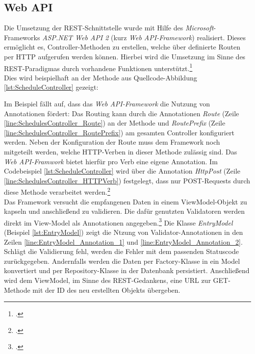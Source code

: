 \subsection{Web API}
\label{ssec:aufbau-webapi}
Die Umsetzung der \ac{REST}-Schnittstelle wurde mit Hilfe des \textit{Microsoft}-Frameworks \textit{ASP.NET Web API 2} (kurz \textit{Web \ac{API}-Framework}) realisiert. Dieses ermöglicht es, Controller-Methoden zu erstellen, welche über definierte Routen per \ac{HTTP} aufgerufen werden können. Hierbei wird die Umsetzung im Sinne des \ac{REST}-Paradigmas durch vorhandene Funktionen unterstützt.\footcite[S. 2ff.]{Building-a-REST-Service}\\
Dies wird beispielhaft an der Methode aus  Quellcode-Abbildung \ref{lst:ScheduleController} gezeigt:

Im Beispiel fällt auf, dass das \textit{Web \ac{API}-Framework} die Nutzung von Annotationen fördert: Das Routing kann durch die Annotationen \textit{Route} (Zeile \ref{line:SchedulesController_Route}) an der Methode und \textit{RoutePrefix} (Zeile \ref{line:SchedulesController_RoutePrefix}) am gesamten Controller konfiguriert werden. Neben der Konfiguration der Route muss dem Framework noch mitgeteilt werden, welche \ac{HTTP}-Verben in dieser Methode zulässig sind. Das \textit{Web \ac{API}-Framwork} bietet hierfür pro Verb eine eigene Annotation. Im Codebeispiel \ref{lst:ScheduleController} wird über die Annotation \textit{HttpPost} (Zeile \ref{line:SchedulesController_HTTPVerb}) festgelegt, dass nur POST-Requests durch diese Methode verarbeitet werden.\footcite{webApi-AttributeRouting} \\
Das Framework versucht die empfangenen Daten in einem ViewModel-Objekt zu kapseln und anschließend zu validieren. Die dafür genutzten Validatoren werden direkt im View-Model als Annotationen angegeben.\footcite{webApi-Validation} Die Klasse \textit{EntryModel} (Beispiel \ref{lst:EntryModel}) zeigt die Ntzung von Validator-Annotationen in den Zeilen \ref{line:EntryModel_Annotation_1} und \ref{line:EntryModel_Annotation_2}. \\ 

Schlägt die Validierung fehl, werden die Fehler mit dem passenden Statuscode zurückgegeben. Andernfalls werden die Daten per \gls{Factory}-Klasse in ein Model konvertiert und per \gls{Repository}-Klasse in der Datenbank persistiert. Anschließend wird dem ViewModel, im Sinne des \ac{REST}-Gedankens, eine URL zur GET-Methode mit der ID des neu erstellten Objekts übergeben. 
